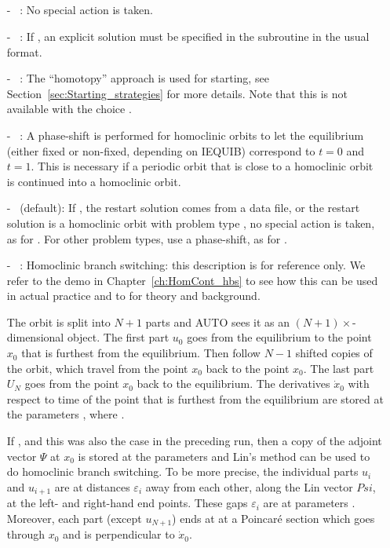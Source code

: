 \documentclass[12pt]{report}
\begin{document}
\subsection{}  \label{sec:ISTART}
\begin{itemize}
\item[-] ~:
No special action is taken.
\item[-] ~: 
If , an explicit solution must be specified in the
subroutine  in the usual format. 
\item[-] ~: 
The ``homotopy'' approach is used for starting, see 
Section~\ref{sec:Starting_strategies} 
for more details. Note that this is not available with the choice 
.
\item[-] ~:
A phase-shift is performed for homoclinic orbits to let the
equilibrium (either fixed or non-fixed, depending on IEQUIB)
correspond to $t=0$ and $t=1$. This is necessary if a periodic
orbit that is close to a homoclinic orbit is continued into
a homoclinic orbit.
\item[-] ~(default):
If , the restart solution comes from a data file, or
the restart solution is a homoclinic orbit with problem
type , no special action is taken, as for .
For other problem types, use a phase-shift, as for .
\item[-] ~:
Homoclinic branch switching: this description is for reference only.
We refer to the demo in Chapter~\ref{ch:HomCont_hbs} to see how this
can be used in actual practice and to  for
theory and background.

The orbit is split into $N+1$ parts and
{\cal AUTO} sees it as an $(N+1)\times$-dimensional object.
The first part $u_0$ goes from the equilibrium to the point $x_0$ that is 
furthest from the equilibrium. 
Then follow $N-1$ shifted copies of the orbit, which travel
from the point $x_0$ back to the point $x_0$. The last part $U_N$
goes from the point $x_0$ back to the equilibrium. 
The derivatives $\dot{x}_0$ with respect to time
of the point that is furthest from the equilibrium are stored at the 
parameters , where .

If , and this was also the case in the preceding run,
then a copy of the adjoint vector $\Psi$ at $x_0$ is stored at the parameters
 and Lin's method can be used
to do homoclinic branch switching. To be more precise, the individual parts
$u_i$ and $u_{i+1}$ are at distances $\varepsilon_i$ away from each
other, along the Lin vector $Psi$, at the left- and right-hand end
points. These gaps $\varepsilon_i$ are at parameters
. Moreover, each part (except $u_{N+1}$) ends at
at a Poincar\'e section which goes through $x_0$ and is perpendicular
to $\dot{x}_0$.


\end{itemize}
\end{document}
